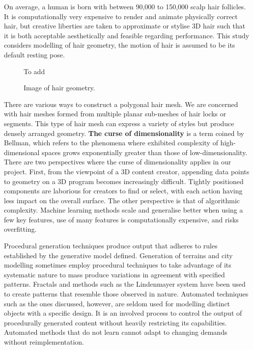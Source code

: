 \documentclass[ %
author={Dillon Keith Diep},
supervisor={Dr. Carl Henrik Ek},
degree={MEng},
title={ART-CG:},
subtitle={Assisted Real-time Content Generation of 3D Hair by Learning Manifolds},
type={Research},
year={2017} ]{dissertation}
\begin{document}
On average, a human is born with between 90,000 to 150,000 scalp hair follicles. \cite{hairfollicles} It is computationally very expensive to render and animate physically correct hair, but creative liberties are taken to approximate or stylise 3D hair such that it is both acceptable aesthetically and feasible regarding performance. This study considers modelling of hair geometry, the motion of hair is assumed to be its default resting pose.

\begin{figure}[!h]
	\centering
	To add %
	\caption{Image of hair geometry.}
\end{figure}

There are various ways to construct a polygonal hair mesh. We are concerned with hair meshes formed from multiple planar sub-meshes of hair locks or segments. This type of hair mesh can express a variety of styles but produce densely arranged geometry. \textbf{The curse of dimensionality} is a term coined by Bellman, \cite{curseofdyn} which refers to the phenomena where exhibited complexity of high-dimensional spaces grows exponentially greater than those of low-dimensionality. There are two perspectives where the curse of dimensionality applies in our project. First, from the viewpoint of a 3D content creator, appending data points to geometry on a 3D program becomes increasingly difficult. Tightly positioned components are laborious for creators to find or select, with each action having less impact on the overall surface. The other perspective is that of algorithmic complexity. Machine learning methods scale and generalise better when using a few key features, use of many features is computationally expensive, and risks overfitting.

Procedural generation techniques produce output that adheres to rules established by the generative model defined. Generation of terrains and city modelling sometimes employ procedural techniques to take advantage of its systematic nature to mass produce variations in agreement with specified patterns. \cite{procedural1} Fractals and methods such as the Lindenmayer system have been used to create patterns that resemble those observed in nature. \cite{lsystem} Automated techniques such as the ones discussed, however, are seldom used for modelling distinct objects with a specific design. It is an involved process to control the output of procedurally generated content without heavily restricting its capabilities. Automated methods that do not learn cannot adapt to changing demands without reimplementation.
\end{document}

